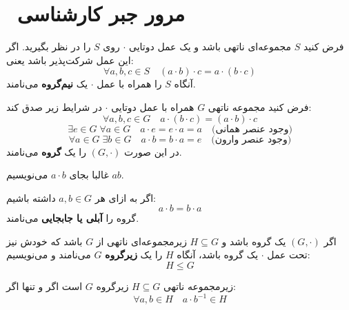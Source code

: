 \section{ مرور جبر کارشناسی}


\begin{definition}
    فرض کنید \( S \) مجموعه‌ای ناتهی باشد و یک عمل دوتایی \(\cdot\) روی \( S \) را در نظر بگیرید.
    اگر این عمل شرکت‌پذیر باشد یعنی:
    \[
        \forall a, b, c \in S \quad (a \cdot b) \cdot c = a \cdot (b \cdot c)
    \]
    آنگاه \( S \) را همراه با عمل \(\cdot\) یک \textbf{نیم‌گروه } می‌نامند.

\end{definition}



\begin{definition}[- گروه]
    فرض کنید مجموعه ناتهی \( G \) همراه با عمل دوتایی \(\cdot\) در شرایط زیر صدق کند:
    \[\forall a, b, c \in G \quad a \cdot (b \cdot c) = (a \cdot b) \cdot c\]
    \[\exists e \in G \; \forall a \in G \quad a \cdot e = e \cdot a = a \quad \text{(وجود عنصر همانی)}\]
    \[\forall a \in G \; \exists b \in G \quad a \cdot b = b \cdot a = e \quad \text{(وجود عنصر وارون)}\]
    در این صورت \( (G, \cdot) \) را یک \textbf{گروه} می‌نامند.

\end{definition}
\begin{remark}
    غالبا  بجای \( a \cdot b \) می‌نویسیم \( ab \).

\end{remark}
\begin{definition}
    اگر به ازای هر \( a, b \in G \) داشته باشیم:
    \[
        a \cdot b = b \cdot a
    \]
    گروه را \textbf{آبلی یا جابجایی} می‌نامند.
\end{definition}


\begin{definition}[ - زیرگروه]
    اگر \( (G, \cdot) \) یک گروه باشد و \( H \subseteq G \) زیرمجموعه‌ای ناتهی از \( G \) باشد که خودش نیز تحت عمل \(\cdot\) یک گروه باشد، آنگاه \( H \) را یک \textbf{زیرگروه} \( G \) می‌نامند و می‌نویسیم:
    \[
        H \leq G
    \]

\end{definition}

\begin{theorem}

    زیرمجموعه ناتهی \( H \subseteq G \) زیرگروه \( G \) است اگر و تنها اگر:
    \[
        \forall a, b \in H \quad a \cdot b^{-1} \in H
    \]
\end{theorem}


